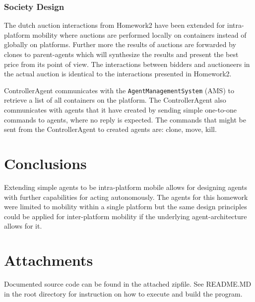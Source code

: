 \documentclass[a4paper, 11pt]{article}
\begin{document}
\subsubsection*{Society Design}
The dutch auction interactions from Homework2 have been extended for intra-platform mobility where auctions are performed locally on containers instead of globally on platforms. Further more the results of auctions are forwarded by clones to parent-agents which will synthesize the results and present the best price from its point of view. The interactions between bidders and auctioneers in the actual auction is identical to the interactions presented in Homework2.

ControllerAgent communicates with the \texttt{AgentManagementSystem} (AMS) to retrieve a list of all containers on the platform. The ControllerAgent also communicates with agents that it have created by sending simple one-to-one commands to agents, where no reply is expected. The commands that might be sent from the ControllerAgent to created agents are: clone, move, kill.
\section*{Conclusions}
Extending simple agents to be intra-platform mobile allows for designing agents with further capabilities for acting autonomously. The agents for this homework were limited to mobility within a single platform but the same design principles could be applied for inter-platform mobility if the underlying agent-architecture allows for it.

\section*{Attachments}
Documented source code can be found in the attached zipfile. See README.MD in the root directory for instruction on how to execute and build the program.

{}

\end{document}
